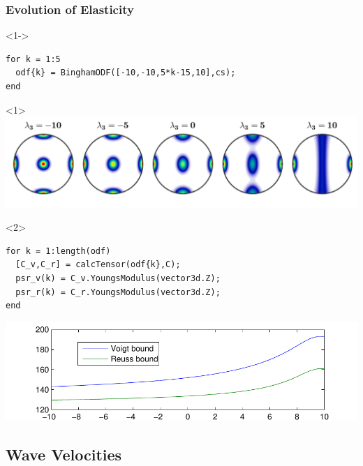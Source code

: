 \documentclass[compress]{beamer}
\begin{document}
\begin{frame}[fragile]
  \frametitle{Evolution of Elasticity}

  \vspace{-0.3cm}
  \begin{overlayarea}{\textwidth}{\textheight}

    \begin{onlyenv}<1->
      \vspace{-0.3cm}
      \begin{lstlisting}[style=input]
for k = 1:5
  odf{k} = BinghamODF([-10,-10,5*k-15,10],cs);
end
\end{lstlisting}
    \end{onlyenv}
    \begin{onlyenv}<1>
      \includegraphics[width=\textwidth]{pic/binghamPDF.pdf}
    \end{onlyenv}

    \begin{onlyenv}<2>
      \vspace{-0.3cm}
\begin{lstlisting}[style=input]
for k = 1:length(odf)
  [C_v,C_r] = calcTensor(odf{k},C);
  psr_v(k) = C_v.YoungsModulus(vector3d.Z);
  psr_r(k) = C_r.YoungsModulus(vector3d.Z);
end
\end{lstlisting}
    \includegraphics[width=\textwidth]{pic/VR.pdf}
    \end{onlyenv}
  \end{overlayarea}
\end{frame}

\subsection*{Wave Velocities}
\end{document}
